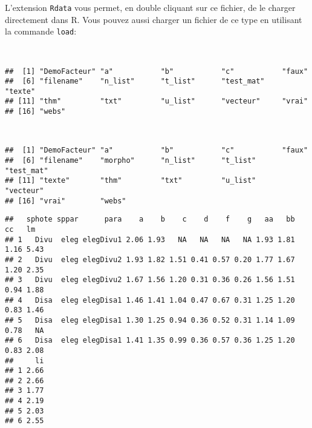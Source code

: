 \noindent L'extension \texttt{Rdata} vous permet, en double cliquant sur ce fichier, de le charger directement dans R.
Vous pouvez aussi charger un fichier de ce type en utilisant la commande \texttt{load}:

\begin{knitrout}
\color{fgcolor}\begin{kframe}
\begin{flushleft}
\ttfamily\noindent
{}\hlkeyword{(}\hlkeyword{)}\hspace*{\fill}\\
\hlstd{}\hlkeyword{(}\hlkeyword{)}\mbox{}
\normalfont
\end{flushleft}
\begin{verbatim}
##  [1] "DemoFacteur" "a"           "b"           "c"           "faux"       
##  [6] "filename"    "n_list"      "t_list"      "test_mat"    "texte"      
## [11] "thm"         "txt"         "u_list"      "vecteur"     "vrai"       
## [16] "webs"       
\end{verbatim}
\begin{flushleft}
\ttfamily\noindent
{}\hlkeyword{(}\hlkeyword{)}\hspace*{\fill}\\
\hlstd{}\hlkeyword{(}\hlkeyword{)}\mbox{}
\normalfont
\end{flushleft}
\begin{verbatim}
##  [1] "DemoFacteur" "a"           "b"           "c"           "faux"       
##  [6] "filename"    "morpho"      "n_list"      "t_list"      "test_mat"   
## [11] "texte"       "thm"         "txt"         "u_list"      "vecteur"    
## [16] "vrai"        "webs"       
\end{verbatim}
\begin{flushleft}
\ttfamily\noindent
{}\hlkeyword{(}\hlkeyword{)}\mbox{}
\normalfont
\end{flushleft}
\begin{verbatim}
##   sphote sppar      para    a    b    c    d    f    g   aa   bb   cc   lm
## 1   Divu  eleg elegDivu1 2.06 1.93   NA   NA   NA   NA 1.93 1.81 1.16 5.43
## 2   Divu  eleg elegDivu2 1.93 1.82 1.51 0.41 0.57 0.20 1.77 1.67 1.20 2.35
## 3   Divu  eleg elegDivu2 1.67 1.56 1.20 0.31 0.36 0.26 1.56 1.51 0.94 1.88
## 4   Disa  eleg elegDisa1 1.46 1.41 1.04 0.47 0.67 0.31 1.25 1.20 0.83 1.46
## 5   Disa  eleg elegDisa1 1.30 1.25 0.94 0.36 0.52 0.31 1.14 1.09 0.78   NA
## 6   Disa  eleg elegDisa1 1.41 1.35 0.99 0.36 0.57 0.36 1.25 1.20 0.83 2.08
##     li
## 1 2.66
## 2 2.66
## 3 1.77
## 4 2.19
## 5 2.03
## 6 2.55
\end{verbatim}
\end{kframe}
\end{knitrout}


